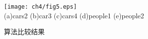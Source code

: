 \begin{figure}[htb]
\begin{center}
\texttt{[image: ch4/fig5.eps]}\\
(a)cars2 \quad\quad (b)car3 \quad\quad\quad (c)cars4 \quad\quad\quad (d)people1 \quad\quad (e)people2
\end{center}
\caption{算法比较结果}
\label{ch4:fig:result}       %
\end{figure}

